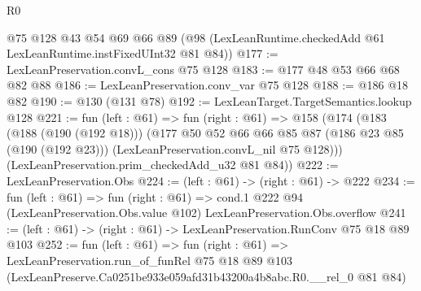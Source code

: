 \begin{lexlean}{R0}
\begin{coremodule}
    @75
    @128
    @43
    @54
    @69
    @66
    @89
    (@98 (LexLeanRuntime.checkedAdd @61 LexLeanRuntime.instFixedUInt32 @81 @84))
@177 := LexLeanPreservation.convL_cons @75 @128
@183 := @177 @48 @53 @66 @68 @82 @88
@186 := LexLeanPreservation.conv_var @75 @128
@188 := @186 @18 @82
@190 := @130 (@131 @78)
@192 := LexLeanTarget.TargetSemantics.lookup @128
@221 := fun (left : @61) =>
  fun (right : @61) =>
  @158
    (@174
      (@183
        (@188 (@190 (@192 @18)))
        (@177
          @50
          @52
          @66
          @66
          @85
          @87
          (@186 @23 @85 (@190 (@192 @23)))
          (LexLeanPreservation.convL_nil @75 @128)))
      (LexLeanPreservation.prim_checkedAdd_u32 @81 @84))
@222 := LexLeanPreservation.Obs
@224 := (left : @61) -> (right : @61) -> @222
@234 := fun (left : @61) =>
  fun (right : @61) =>
  cond.{1} @222 @94 (LexLeanPreservation.Obs.value @102) LexLeanPreservation.Obs.overflow
@241 := (left : @61) -> (right : @61) -> LexLeanPreservation.RunConv @75 @18 @89 @103
@252 := fun (left : @61) =>
  fun (right : @61) =>
  LexLeanPreservation.run_of_funRel
    @75
    @18
    @89
    @103
    (LexLeanPreserve.Ca0251be933e059afd31b43200a4b8abc.R0.__rel_0 @81 @84)
\end{coremodule}
\end{lexlean}

